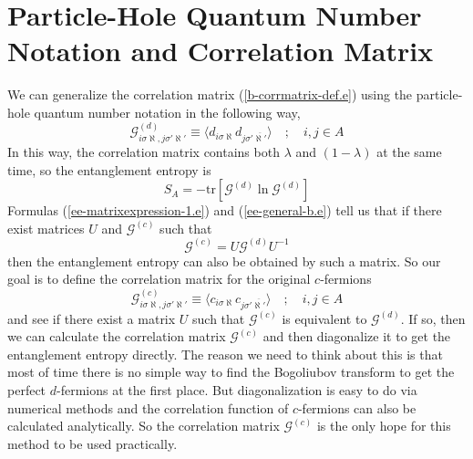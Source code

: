 \documentclass[12font]{article}
\theoremstyle{definition}
\numberwithin{equation}{section}
\newcommand{\anglelr}[1]{\langle #1 \rangle}
\newcommand{\lrm}[1]{\left[  #1  \right]}
\newcommand{\mrm}[1]{\mathrm{#1}}
\newcommand{\tr}{\mrm{tr}}
\begin{document}
\section{Particle-Hole Quantum Number Notation and Correlation Matrix}
We can generalize the correlation matrix (\ref{b-corrmatrix-def.e}) using the particle-hole quantum number notation in the following way,
\begin{equation}\label{correlation-general-def-b.e}
  \mathcal{G}^{(d)}_{i\sigma\aleph,j\sigma'\aleph'} \equiv \anglelr{  d_{i\sigma\aleph}d_{j\sigma'\overline{\aleph'}} } \quad;\quad i,j\in A
\end{equation}
In this way, the correlation matrix contains both $\lambda$ and $(1-\lambda)$ at the same time, so the entanglement entropy is 
\begin{equation}\label{ee-general-b.e}
  S_A = -\tr\lrm{\mathcal{G}^{(d)}\ln\mathcal{G}^{(d)}}
\end{equation}
Formulas (\ref{ee-matrixexpression-1.e}) and (\ref{ee-general-b.e}) tell us that if there exist matrices $U$ and $\mathcal{G}^{(c)}$ such that
\[
\mathcal{G}^{(c)} = U\mathcal{G}^{(d)}U^{-1}
\]
then the entanglement entropy can also be obtained by such a matrix. So our goal is to define the correlation matrix for the original $c$-fermions
\begin{equation}\label{correlation-general-c-def.e}
  \mathcal{G}^{(c)}_{i\sigma\aleph,j\sigma'\aleph'} \equiv \anglelr{  c_{i\sigma\aleph}c_{j\sigma'\overline{\aleph'}} } \quad;\quad i,j\in A
\end{equation}
and see if there exist a matrix $U$ such that $\mathcal{G}^{(c)}$ is equivalent to $\mathcal{G}^{(d)}$. If so, then we can calculate the correlation matrix $\mathcal{G}^{(c)}$ and then diagonalize it to get the entanglement entropy directly. The reason we need to think about this is that most of time there is no simple way to find the Bogoliubov transform to get the perfect $d$-fermions at the first place. But diagonalization is easy to do via numerical methods and the correlation function of $c$-fermions can also be calculated analytically. So the correlation matrix $\mathcal{G}^{(c)}$ is the only hope for this method to be used practically. 
\end{document}
